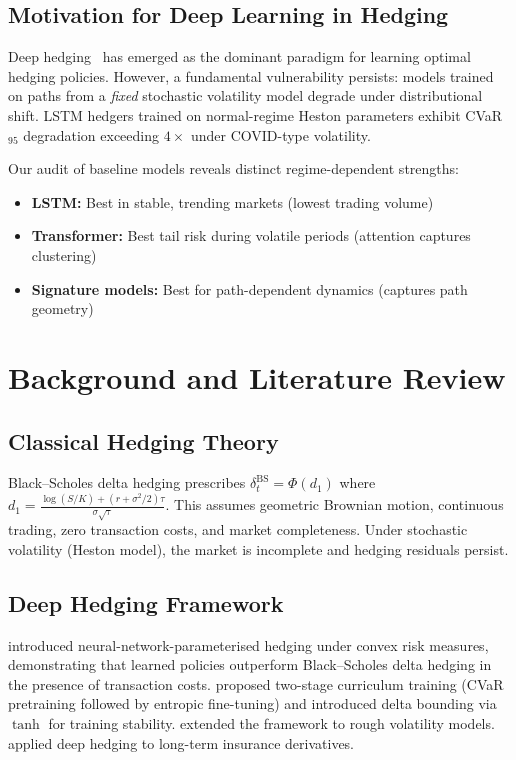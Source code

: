 \subsection{Motivation for Deep Learning in Hedging}

Deep hedging~\citep{buehler2019deep} has emerged as the dominant paradigm for learning optimal hedging policies. However, a fundamental vulnerability persists: models trained on paths from a \emph{fixed} stochastic volatility model degrade under distributional shift. LSTM hedgers trained on normal-regime Heston parameters exhibit CVaR$_{95}$ degradation exceeding $4\times$ under COVID-type volatility.

Our audit of baseline models reveals distinct regime-dependent strengths:
\begin{itemize}[noitemsep]
    \item \textbf{LSTM:} Best in stable, trending markets (lowest trading volume)
    \item \textbf{Transformer:} Best tail risk during volatile periods (attention captures clustering)
    \item \textbf{Signature models:} Best for path-dependent dynamics (captures path geometry)
\end{itemize}

\section{Background and Literature Review}
\label{sec:background}

\subsection{Classical Hedging Theory}

Black--Scholes delta hedging prescribes $\delta_t^{\mathrm{BS}} = \Phi(d_1)$ where $d_1 = \frac{\log(S/K)+(r+\sigma^2/2)\tau}{\sigma\sqrt\tau}$. This assumes geometric Brownian motion, continuous trading, zero transaction costs, and market completeness. Under stochastic volatility (Heston model), the market is incomplete and hedging residuals persist.

\subsection{Deep Hedging Framework}

\citet{buehler2019deep} introduced neural-network-parameterised hedging under convex risk measures, demonstrating that learned policies outperform Black--Scholes delta hedging in the presence of transaction costs. \citet{kozyra2019deep} proposed two-stage curriculum training (CVaR pretraining followed by entropic fine-tuning) and introduced delta bounding via $\tanh$ for training stability. \citet{horvath2021deep} extended the framework to rough volatility models. \citet{carbonneau2021deep} applied deep hedging to long-term insurance derivatives.



